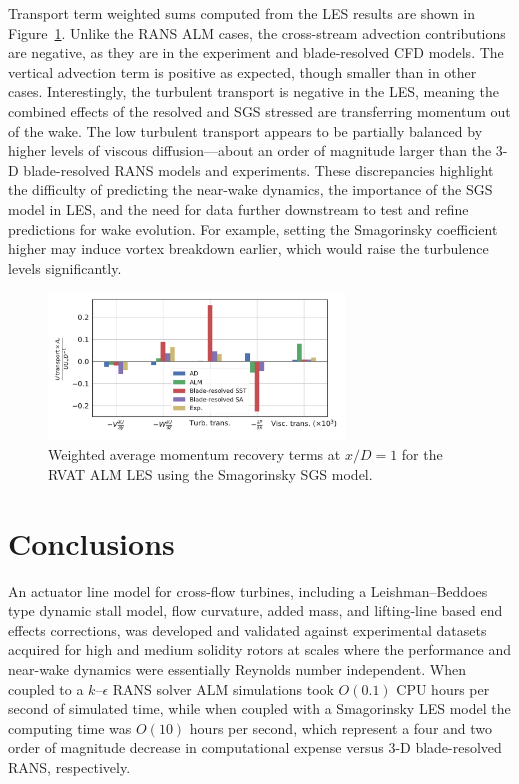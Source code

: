 \documentclass[times]{weauth}
\begin{document}
Transport term weighted sums computed from the LES results are shown in
Figure~\ref{fig:RVAT-ALM-LES-recovery}. Unlike the RANS ALM cases, the
cross-stream advection contributions are negative, as they are in the experiment
and blade-resolved CFD models. The vertical advection term is positive as
expected, though smaller than in other cases. Interestingly, the turbulent
transport is negative in the LES, meaning the combined effects of the resolved
and SGS stressed are transferring momentum out of the wake. The low turbulent
transport appears to be partially balanced by higher levels of viscous
diffusion---about an order of magnitude larger than the 3-D blade-resolved RANS
models and experiments. These discrepancies highlight the difficulty of
predicting the near-wake dynamics, the importance of the SGS model in LES, and
the need for data further downstream to test and refine predictions for wake
evolution. For example, setting the Smagorinsky coefficient higher may induce
vortex breakdown earlier, which would raise the turbulence levels significantly.

\begin{figure}
    \centering

    \includegraphics[width=0.7\textwidth]{RVAT-ALM-LES_recovery-bar-chart}

    \caption{Weighted average momentum recovery terms at $x/D=1$ for the RVAT
        ALM LES using the Smagorinsky SGS model.}

    \label{fig:RVAT-ALM-LES-recovery}
\end{figure}


\section{Conclusions}

An actuator line model for cross-flow turbines, including a Leishman--Beddoes
type dynamic stall model, flow curvature, added mass, and lifting-line based end
effects corrections, was developed and validated against experimental datasets
acquired for high and medium solidity rotors at scales where the performance and
near-wake dynamics were essentially Reynolds number independent. When coupled to
a $k$--$\epsilon$ RANS solver ALM simulations took $O(0.1)$ CPU hours per second
of simulated time, while when coupled with a Smagorinsky LES model the computing
time was $O(10)$ hours per second, which represent a four and two order of
magnitude decrease in computational expense versus 3-D blade-resolved RANS,
respectively.
\end{document}
